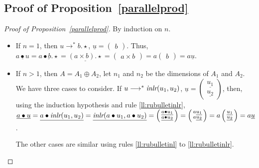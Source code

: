 \documentclass[screen, sigconf,authorversion,nonacm]{acmart}
\theoremstyle{acmdefinition}
\numberwithin{equation}{section}
\newcommand\inlr{\mbox{\it inlr}}
\newcommand\lra{\longrightarrow}
\begin{document}
\subsection{Proof of Proposition~\ref{parallelprod}}
\begin{proof}[Proof of Proposition~\ref{parallelprod}]
  By induction on $n$.

  \begin{itemize}
    \item 
      If $n = 1$, then $u \lra^* b.\star$, $\underline{u} =
      \left(\begin{smallmatrix} b \end{smallmatrix}\right)$.  Thus,
      $\underline{a \bullet u} = \underline{a \bullet b.\star} =
      \underline{(a \times b).\star} = \left(\begin{smallmatrix} a \times
      b \end{smallmatrix}\right) = a \left(\begin{smallmatrix}
      b \end{smallmatrix}\right) = a \underline {u}$.

    \item 
      If $n > 1$, then $A = A_1 \oplus A_2$, let $n_1$ and $n_2$ be the
      dimensions of $A_1$ and $A_2$. We have
      three cases to consider. If 
      $u \lra^* \inlr(u_1,u_2)$,
      $\underline{u} = \left(\begin{smallmatrix} \underline{u_1}
	  \\ \underline{u_2}
      \end{smallmatrix}\right)$,
      then, using the induction hypothesis and rule \eqref{ll:rubulletinlr},
      $\underline{a \bullet u} = 
      \underline{a \bullet \inlr(u_1,u_2)}
      =
      \underline{\inlr(a \bullet u_1,a \bullet u_2)}
      =
      \left(\begin{smallmatrix} \underline{a \bullet u_1} \\
	  \underline{a \bullet u_2}
      \end{smallmatrix}\right)
      = 
      \left(\begin{smallmatrix} a \underline{u_1}  \\
	  a \underline{u_2} 
      \end{smallmatrix}\right)
      =
      a \left(\begin{smallmatrix} \underline{u_1} \\
	  \underline{u_2}
      \end{smallmatrix}\right)
      = a \underline{u}$.

      The other cases are similar using rules \eqref{ll:rubulletinl} to
      \eqref{ll:rubulletinlr}.  \qedhere
  \end{itemize}
\end{proof}
\end{document}
